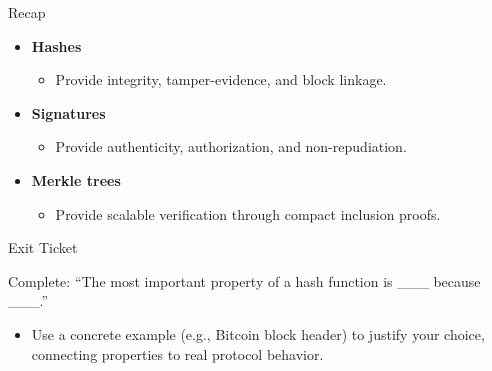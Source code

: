 \documentclass[aspectratio=169]{beamer}
\newcommand{\qbox}[1]{\begin{tcolorbox}#1\end{tcolorbox}}
\begin{document}
\begin{frame}{Recap}
  \begin{itemize}
    \item \textbf{Hashes}
      \begin{itemize}
        \item Provide integrity, tamper-evidence, and block linkage.
      \end{itemize}
    \item \textbf{Signatures}
      \begin{itemize}
        \item Provide authenticity, authorization, and non-repudiation.
      \end{itemize}
    \item \textbf{Merkle trees}
      \begin{itemize}
        \item Provide scalable verification through compact inclusion proofs.
      \end{itemize}
  \end{itemize}
\end{frame}

\begin{frame}{Exit Ticket}
  \qbox{Complete: “The most important property of a hash function is \_\_\_ because \_\_\_.”}
  \begin{itemize}
    \item Use a concrete example (e.g., Bitcoin block header) to justify your choice, connecting properties to real protocol behavior.
  \end{itemize}
\end{frame}
\end{document}
